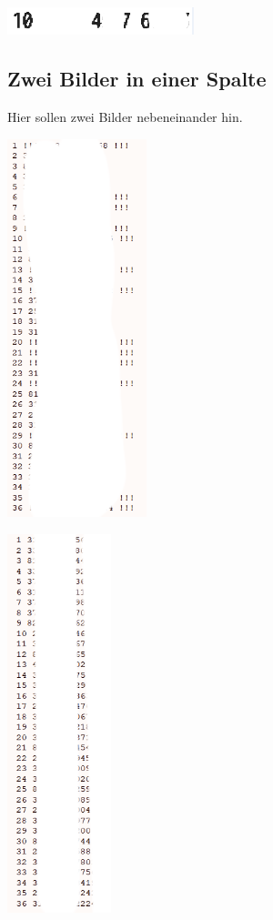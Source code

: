 \par\medskip\noindent\minipage{\linewidth}
\centering
\begin{minipage}[b]{\textwidth}
    \centering
    \includegraphics[height=0.8cm, fbox]{image3.png}
    \label{fig:someimage}
\end{minipage}
\endminipage\par\medskip

\subsection{Zwei Bilder in einer Spalte}
Hier sollen zwei Bilder nebeneinander hin.
\par\medskip\noindent\minipage{\linewidth}
    \centering
    \begin{minipage}[b]{0.4\textwidth}
        \includegraphics[height=11cm, fbox]{image2.png}
        \label{fig:someotherimage}
    \end{minipage}
    \hfill
    \begin{minipage}[b]{0.4\textwidth}
        \includegraphics[height=11cm, fbox]{image1.png}
        \label{fig:yetanotherimage}
    \end{minipage}
\endminipage\par\medskip



